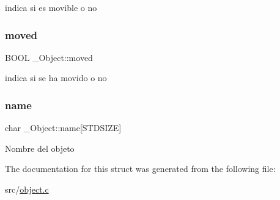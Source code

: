 indica si es movible o no \mbox{\label{struct__Object_a584096c8e43f53884aa7216505cc0e89}} 
\subsubsection{\texorpdfstring{moved}{moved}}
{\footnotesize\ttfamily B\+O\+OL \+\_\+\+Object\+::moved}

indica si se ha movido o no \mbox{\label{struct__Object_a5f13167436f75d12f48d3f152ce91d0a}} 
\subsubsection{\texorpdfstring{name}{name}}
{\footnotesize\ttfamily char \+\_\+\+Object\+::name\mbox{[}S\+T\+D\+S\+I\+ZE\mbox{]}}

Nombre del objeto 

The documentation for this struct was generated from the following file\+:\begin{DoxyCompactItemize}
\item 
src/\hyperlink{object_8c}{object.\+c}\end{DoxyCompactItemize}
